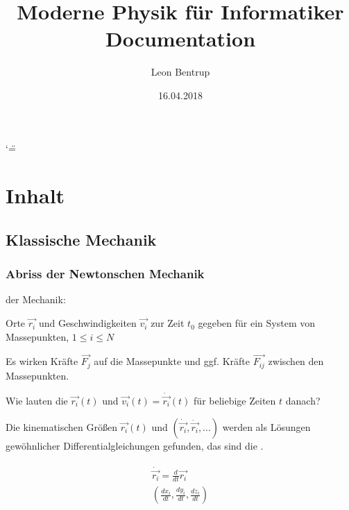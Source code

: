 \documentclass[a4paper,10pt,ngerman]{sphinxmanual}
\title{Moderne Physik für Informatiker Documentation}
\date{16.04.2018}
\author{Leon Bentrup}
\begin{document}
\ifnum\catcode`\"=\active{}\fi
\maketitle
\sphinxtableofcontents
{}\label{\detokenize{index::doc}}



\chapter{Inhalt}
\label{\detokenize{index:moderne-physik-fur-informatiker}}\label{\detokenize{index:inhalt}}

\section{Klassische Mechanik}
\label{\detokenize{klassischemechanik:klassische-mechanik}}\label{\detokenize{klassischemechanik::doc}}

\subsection{Abriss der Newtonschen Mechanik}
\label{\detokenize{klassischemechanik:abriss-der-newtonschen-mechanik}}
 der Mechanik:

Orte \(\vec{r_i}\) und Geschwindigkeiten \(\vec{v_i}\)
zur Zeit \(t_0\) gegeben für ein System von Massepunkten,
\(1 \le i \le N\)

Es wirken Kräfte \(\vec{F_j}\) auf die Massepunkte und ggf.
Kräfte \(\vec{F_{ij}}\) zwischen den Massepunkten.

Wie lauten die  \(\vec{r_i}(t)\)
und \(\vec{v_i}(t) = \dot{\vec{r_i}}(t)\) für beliebige
Zeiten \(t\) danach?

Die kinematischen Größen \(\vec{r_i}(t)\) und \((\dot{\vec{r_i}}, \ddot{\vec{r_i}}, ...)\)
werden als Lösungen gewöhnlicher Differentialgleichungen gefunden,
das sind die .

\begin{sphinxShadowBox}
\begin{align*}\!\begin{aligned}
\dot{\vec{r_i}} = \frac{d}{dt}\vec{r_i}\\
(\frac{dx_i}{dt}, \frac{dy_i}{dt}, \frac{dz_i}{dt})\\
\end{aligned}\end{align*}\end{sphinxShadowBox}
\end{document}
